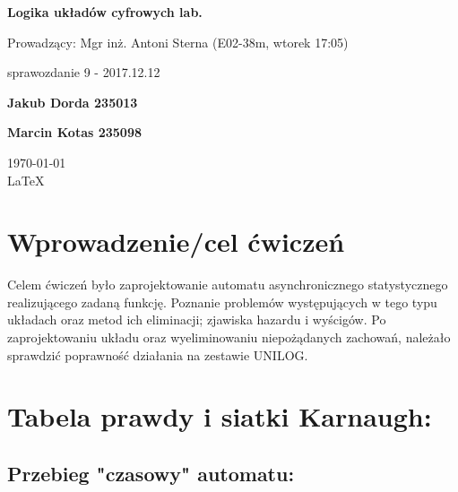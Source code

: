 \documentclass[12pt,a4paper]{article}
\begin{document}
	
	\begin{titlepage}
		
		\centering
		{\huge\bfseries Logika układów cyfrowych lab.\par}
		
		\vspace{0.5cm}
		Prowadzący: Mgr inż. Antoni Sterna (E02-38m, wtorek 17:05) \\
	
		\vspace{1.1cm}
		{\Large sprawozdanie 9 - 2017.12.12\par}
		\vfill
		
		{\large\bfseries Jakub Dorda 235013\par}
		{\large\bfseries Marcin Kotas 235098\par}
		
		\vspace{1cm}
		\today \\ \LaTeX
		
		\restoregeometry
	\end{titlepage}


	\section{Wprowadzenie/cel ćwiczeń}
	
		Celem ćwiczeń było zaprojektowanie automatu asynchronicznego statystycznego realizującego zadaną funkcję.
		Poznanie problemów występujących w tego typu układach oraz metod ich eliminacji; zjawiska hazardu i wyścigów.
		Po zaprojektowaniu układu oraz wyeliminowaniu niepożądanych zachowań, należało sprawdzić poprawność działania na
		zestawie UNILOG.
		
	\section{Tabela prawdy i siatki Karnaugh:}
		
		\subsection{Przebieg "czasowy" automatu:}
		
\end{document}
